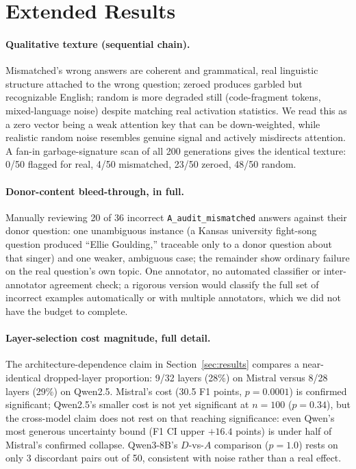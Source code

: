 \documentclass[11pt]{article}
\begin{document}
\section{Extended Results}
\label{app:results-ext}

\paragraph{Qualitative texture (sequential chain).} Mismatched's wrong
answers are coherent and grammatical, real linguistic structure
attached to the wrong question; zeroed produces garbled but
recognizable English; random is more degraded still (code-fragment
tokens, mixed-language noise) despite matching real activation
statistics. We read this as a zero vector being a weak attention key
that can be down-weighted, while realistic random noise resembles
genuine signal and actively misdirects attention. A fan-in
garbage-signature scan of all 200 generations gives the identical
texture: 0/50 flagged for real, 4/50 mismatched, 23/50 zeroed, 48/50
random.

\paragraph{Donor-content bleed-through, in full.} Manually reviewing 20
of 36 incorrect \texttt{A\_audit\_mismatched} answers against their
donor question: one unambiguous instance (a Kansas university
fight-song question produced ``Ellie Goulding,'' traceable only to a
donor question about that singer) and one weaker, ambiguous case; the
remainder show ordinary failure on the real question's own topic. One
annotator, no automated classifier or inter-annotator agreement check;
a rigorous version would classify the full set of incorrect examples
automatically or with multiple annotators, which we did not have the
budget to complete.

\paragraph{Layer-selection cost magnitude, full detail.} The
architecture-dependence claim in Section~\ref{sec:results} compares a
near-identical dropped-layer proportion: 9/32 layers (28\%) on Mistral
versus 8/28 layers (29\%) on Qwen2.5. Mistral's cost (30.5 F1 points,
$p=0.0001$) is confirmed significant; Qwen2.5's smaller cost is not yet
significant at $n=100$ ($p=0.34$), but the cross-model claim does not
rest on that reaching significance: even Qwen's most generous
uncertainty bound (F1 CI upper $+16.4$ points) is under half of
Mistral's confirmed collapse. Qwen3-8B's $D$-vs-$A$ comparison ($p=1.0$)
rests on only 3 discordant pairs out of 50, consistent with noise
rather than a real effect.
\end{document}
